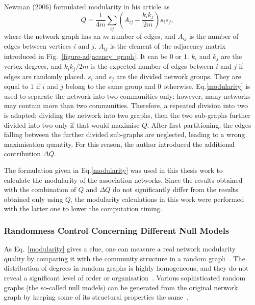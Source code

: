 Newman (2006) formulated modularity in his article as
\begin{equation} %
	Q = \frac {1} {4 m}\sum_ {ij} (A_{ij} - \frac {k_{i} k_{j}}{2 m}) s_{i} s_{j} ,
	\label{modularity}
\end{equation}
where the network graph has an $m$ number of edges, and $A_{ij}$ is the number of edges between vertices $i$ and $j$. $A_{ij}$ is the element of the adjacency matrix introduced in Fig.~\ref{figure-adjacency_graph}. It can be $0$ or $1$. $k_{i}$ and $k_{j}$ are the vertex degrees, and ${k_{i} k_{j}}/{2 m}$ is the expected number of edges between $i$ and $j$ if edges are randomly placed. $s_{i}$ and $s_{j}$ are the divided network groups. They are equal to $1$ if $i$ and $j$ belong to the same group and $0$ otherwise. Eq.\eqref{modularity} is used to separate the network into two communities only; however, many networks may contain more than two communities. Therefore, a repeated division into two is adapted: dividing the network into two graphs, then the two sub-graphs further divided into two only if that would maximise $Q$. After first partitioning, the edges falling between the further divided sub-graphs are neglected, leading to a wrong maximisation quantity. For this reason, the author introduced the additional contribution $\Delta Q$.~\cite{Newman8577}

The formulation given in Eq.\eqref{modularity} was used in this thesis work to calculate the modularity of the association networks. Since the results obtained with the combination of $Q$ and $\Delta Q$ do not significantly differ from the results obtained only using $Q$, the modularity calculations in this work were performed with the latter one to lower the computation timing.

\subsubsection*{Randomness Control Concerning Different Null Models}
As Eq.~\eqref{modularity} gives a clue, one can measure a real network modularity quality by comparing it with the community structure in a random graph~\cite{GirvanNewman2004}. The distribution of degrees in random graphs is highly homogeneous, and they do not reveal a significant level of order or organisation~\cite{FORTUNATO201075}. Various sophisticated random graphs (the so-called null models) can be generated from the original network graph by keeping some of its structural properties the same~\cite{Maslov910, MERTEN2020, FORTUNATO201075, Enders2018}.


